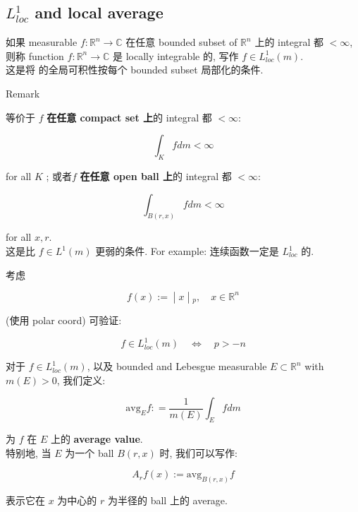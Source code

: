 \subsection{\texorpdfstring{\(L_{loc}^{1}\) and local average}{L\_\{loc\}\^{}\{1\} and local average}}

\begin{definition}{}

如果 measurable \(f:\mathbb{R}^{n}\rightarrow\mathbb{C}\) 在任意 bounded subset of \(\mathbb{R}^{n}\) 上的 integral 都 \(< \infty\), 则称 function \(f:\mathbb{R}^{n}\rightarrow\mathbb{C}\) 是 locally integrable 的, 写作 \(f \in L_{loc}^{1}(m)\).\\
这是将  的全局可积性按每个 bounded subset 局部化的条件.

\end{definition}

\begin{qlremark}{Remark}

等价于 \(f\) \textbf{在任意 compact set 上}的 integral 都 \(< \infty\):

\[\int_{K}f dm < \infty\]

for all \(K\) ; 或者\(f\) \textbf{在任意 open ball 上}的 integral 都 \(< \infty\):

\[\int_{B(r,x)}f dm < \infty\]

for all \(x,r\).\\
这是比 \(f \in L^{1}(m)\) 更弱的条件. For example: 连续函数一定是 \(L_{loc}^{1}\) 的.

\end{qlremark}

\begin{example}

考虑

\[\left. f(x) := \middle| x \middle| {}_{p},\quad x \in \mathbb{R}^{n} \right.\]

(使用 polar coord) 可验证:

\[f \in L_{loc}^{1}(m)\quad\Leftrightarrow\quad p > - n\]

\end{example}

\begin{definition}{}

对于 \(f \in L_{loc}^{1}(m)\), 以及 bounded and Lebesgue measurable \(E \subset \mathbb{R}^{n}\) with \(m(E) > 0\), 我们定义:

\[\text{avg}_{E}f: = \frac{1}{m(E)}\int_{E}f dm\]

为 \(f\) 在 \(E\) 上的 \textbf{average value}.\\
特别地, 当 \(E\) 为一个 ball \(B(r,x)\) 时, 我们可以写作:

\[A_{r}f(x) := \text{avg}_{B(r,x)}f\]

表示它在 \(x\) 为中心的 \(r\) 为半径的 ball 上的 average.

\end{definition}

